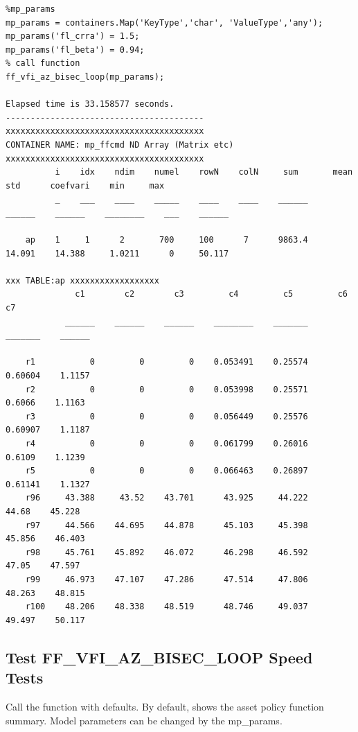 \documentclass[
]{book}
\begin{document}
\begin{verbatim}
%mp_params
mp_params = containers.Map('KeyType','char', 'ValueType','any');
mp_params('fl_crra') = 1.5;
mp_params('fl_beta') = 0.94;
% call function
ff_vfi_az_bisec_loop(mp_params);

Elapsed time is 33.158577 seconds.
----------------------------------------
xxxxxxxxxxxxxxxxxxxxxxxxxxxxxxxxxxxxxxxx
CONTAINER NAME: mp_ffcmd ND Array (Matrix etc)
xxxxxxxxxxxxxxxxxxxxxxxxxxxxxxxxxxxxxxxx
          i    idx    ndim    numel    rowN    colN     sum       mean      std      coefvari    min     max  
          _    ___    ____    _____    ____    ____    ______    ______    ______    ________    ___    ______

    ap    1     1      2       700     100      7      9863.4    14.091    14.388     1.0211      0     50.117

xxx TABLE:ap xxxxxxxxxxxxxxxxxx
              c1        c2        c3         c4         c5         c6         c7  
            ______    ______    ______    ________    _______    _______    ______

    r1           0         0         0    0.053491    0.25574    0.60604    1.1157
    r2           0         0         0    0.053998    0.25571     0.6066    1.1163
    r3           0         0         0    0.056449    0.25576    0.60907    1.1187
    r4           0         0         0    0.061799    0.26016     0.6109    1.1239
    r5           0         0         0    0.066463    0.26897    0.61141    1.1327
    r96     43.388     43.52    43.701      43.925     44.222      44.68    45.228
    r97     44.566    44.695    44.878      45.103     45.398     45.856    46.403
    r98     45.761    45.892    46.072      46.298     46.592      47.05    47.597
    r99     46.973    47.107    47.286      47.514     47.806     48.263    48.815
    r100    48.206    48.338    48.519      48.746     49.037     49.497    50.117
\end{verbatim}

\hypertarget{test-ff_vfi_az_bisec_loop-speed-tests}{%
\subsection{Test FF\_VFI\_AZ\_BISEC\_LOOP Speed Tests}\label{test-ff_vfi_az_bisec_loop-speed-tests}}

Call the function with defaults. By default, shows the asset policy
function summary. Model parameters can be changed by the mp\_params.
\end{document}
